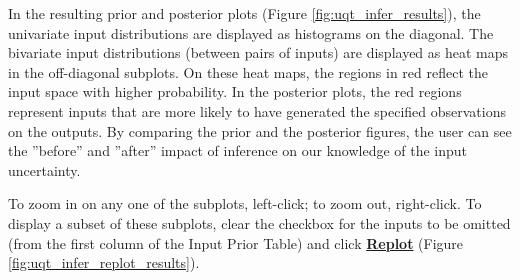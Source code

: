 In the resulting prior and posterior plots 
(Figure \ref{fig:uqt_infer_results}), the univariate
input distributions are displayed as histograms on the
diagonal. The bivariate input distributions (between pairs of inputs)
are displayed as heat maps in the off-diagonal subplots. On these heat
maps, the regions in red reflect the input space with higher probability. 
In the posterior plots, the red regions represent inputs that are more
likely to have generated the specified observations on the outputs. By
comparing the prior and the posterior figures, the user can see the ''before''
and ''after'' impact of inference on our knowledge of the input
uncertainty.

To zoom in on any one of the subplots, left-click; to zoom out, right-click.
To display a subset of these subplots, clear the checkbox for the inputs to be omitted
(from the first column of the Input Prior Table) and click \textbf{\underline{Replot}}
(Figure \ref{fig:uqt_infer_replot_results}). 

